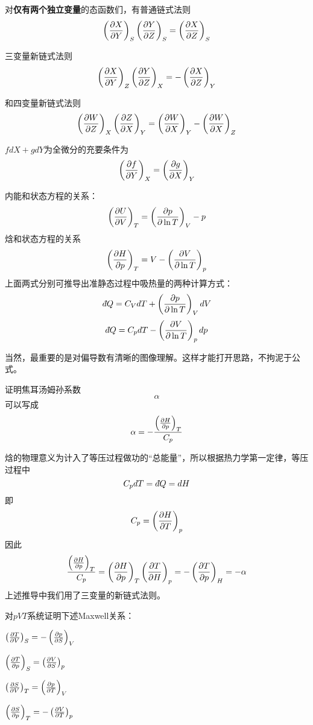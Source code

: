 \documentclass[CJK]{beamer}
\begin{document}
\begin{frame}
  \bch
  对{\bf 仅有两个独立变量}的态函数们，有普通链式法则
  $$\pfrac XYS \pfrac YZS = \pfrac XZS$$

  三变量新链式法则
  $$\pfrac XYZ \pfrac YZX = -\pfrac XZY$$

  和四变量新链式法则
  $$ \pfrac WZX \pfrac ZXY = \pfrac WXY - \pfrac WXZ  $$
  
  \ech
\end{frame}


\begin{frame}
  \bch
  $ f dX + g dY$为全微分的充要条件为
  $$\pfrac fYX = \pfrac gXY $$
  
  \ech
\end{frame}


\begin{frame}
  \bch
  {\small
  内能和状态方程的关系：
    $$\pfrac UVT = \pfrac p{\ln T}V - p $$
  焓和状态方程的关系
  $$\pfrac HpT = V - \pfrac V{\ln T}p  $$
  上面两式分别可推导出准静态过程中吸热量的两种计算方式：
    $$ \dbar Q = C_VdT + \pfrac p{\ln T}V dV $$
  $$ \dbar Q = C_pdT - \pfrac V{\ln T}p dp $$  
}
  \ech
\end{frame}


\begin{frame}
  \bch
  当然，最重要的是对偏导数有清晰的图像理解。这样才能打开思路，不拘泥于公式。
  \ech
\end{frame}


\begin{frame}
  \chtitle{\proid (\sone)}
  \bch
  证明焦耳汤姆孙系数$$ \alpha$$可以写成
  $$ \alpha = -\frac{\pfrac HpT}{C_p} $$
\ech
\end{frame}

\begin{frame}
  \bch
  焓的物理意义为计入了等压过程做功的“总能量”，所以根据热力学第一定律，等压过程中
  $$C_p dT = \dbar Q = dH$$
  即$$C_p = \pfrac HTp$$
  因此
  $$ \frac{\pfrac HpT}{C_p} = \pfrac HpT \pfrac THp = -\pfrac TpH  = -\alpha$$
  上述推导中我们用了三变量的新链式法则。
  
\ech
\end{frame}


\begin{frame}
  \chtitle{\proid (\stwo)}
  \bch
  对$pVT$系统证明下述Maxwell关系：
\bitem
\item{$\pfrac TVS = -\pfrac pSV$}
\item{$\pfrac TpS = \pfrac VSp$}
\item{$\pfrac SVT = \pfrac pTV$}
\item{$\pfrac SpT = -\pfrac VTp$}
\eitem
\ech
\end{frame}
\end{document}
